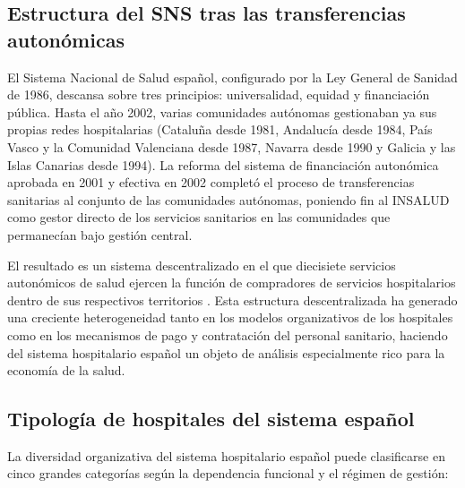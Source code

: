 \documentclass[12pt, a4paper, twoside, openright]{book}
\theoremstyle{plain}
\theoremstyle{definition}
\theoremstyle{remark}
\begin{document}
\subsection{Estructura del SNS tras las transferencias autonómicas}

El Sistema Nacional de Salud español, configurado por la Ley General de Sanidad de 1986, descansa sobre tres principios: universalidad, equidad y financiación pública. Hasta el año 2002, varias comunidades autónomas gestionaban ya sus propias redes hospitalarias (Cataluña desde 1981, Andalucía desde 1984, País Vasco y la Comunidad Valenciana desde 1987, Navarra desde 1990 y Galicia y las Islas Canarias desde 1994). La reforma del sistema de financiación autonómica aprobada en 2001 y efectiva en 2002 completó el proceso de transferencias sanitarias al conjunto de las comunidades autónomas, poniendo fin al INSALUD como gestor directo de los servicios sanitarios en las comunidades que permanecían bajo gestión central.

El resultado es un sistema descentralizado en el que diecisiete servicios autonómicos de salud ejercen la función de compradores de servicios hospitalarios dentro de sus respectivos territorios \citep{repullo2008}. Esta estructura descentralizada ha generado una creciente heterogeneidad tanto en los modelos organizativos de los hospitales como en los mecanismos de pago y contratación del personal sanitario, haciendo del sistema hospitalario español un objeto de análisis especialmente rico para la economía de la salud.

\subsection{Tipología de hospitales del sistema español}

La diversidad organizativa del sistema hospitalario español puede clasificarse en cinco grandes categorías según la dependencia funcional y el régimen de gestión:
\end{document}
